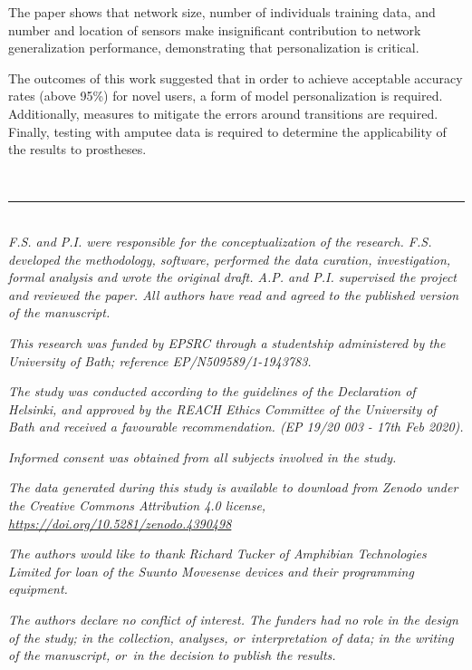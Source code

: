 The paper shows that network size, number of individuals training data, and number and location of sensors make insignificant contribution to network generalization performance, demonstrating that personalization is critical.

The outcomes of this work suggested that in order to achieve acceptable accuracy rates (above 95\%) for novel users, a form of model personalization is required. Additionally, measures to mitigate the errors around transitions are required. Finally, testing with amputee data is required to determine the applicability of the results to prostheses.

\ \\

{\hrule height 0.5pt} \ \\

\textit{F.S. and P.I. were responsible for the conceptualization of the research. F.S. developed the methodology, software, performed the data curation, investigation, formal analysis and wrote the original draft. A.P. and P.I. supervised the project and reviewed the paper. All authors have read and agreed to the published version of the manuscript.}

\textit{This research was funded by EPSRC through a studentship administered by the University of Bath; reference EP/N509589/1-1943783.}

\textit{The study was conducted according to the guidelines of the Declaration of Helsinki, and approved by the REACH Ethics Committee of the University of Bath and received a favourable recommendation. (EP 19/20 003 - 17th Feb 2020).}

\textit{Informed consent was obtained from all subjects involved in the study.}

\textit{The data generated during this study is available to download from Zenodo under the Creative Commons Attribution 4.0 license, \href{https://doi.org/10.5281/zenodo.4390498}{https://doi.org/10.5281/zenodo.4390498}}

\textit{The authors would like to thank Richard Tucker of Amphibian Technologies Limited for loan of the Suunto Movesense devices and their programming equipment.}

\textit{The authors declare no conflict of interest. The funders had no role in the design of the study; in the collection, analyses, or~interpretation of data; in the writing of the manuscript, or~in the decision to publish the results.} 